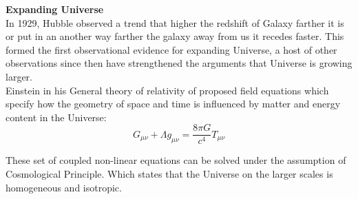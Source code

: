 \documentclass{article}
\begin{document}
\textbf{Expanding Universe} 
\\In 1929, Hubble observed a trend that higher the redshift of Galaxy farther it is or put in an another way farther the galaxy away from us it recedes faster. This formed the first observational evidence for expanding Universe, a host of other observations since then have strengthened the arguments that Universe is growing larger.
\\Einstein in his General theory of relativity of proposed field equations which specify how the geometry of space and time is influenced by matter and energy content in the Universe:
$$G_{\mu \nu} + \Lambda g_{\mu \nu} = \frac{8\pi G}{c^{4}}T_{\mu \nu}$$

These set of coupled non-linear equations can be solved under the assumption of Cosmological Principle. Which states that the Universe on the larger scales is homogeneous and isotropic. 
\end{document}
